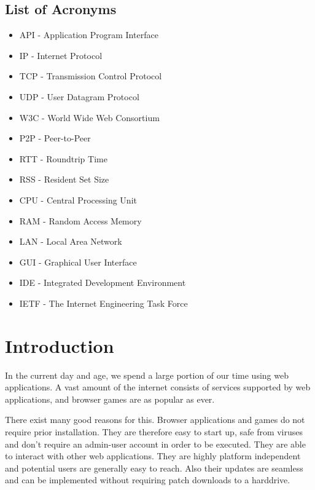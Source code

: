 \documentclass[bsc,frontabs,twoside,singlespacing,parskip,deptreport]{infthesis}     %
\begin{document}
\section*{List of Acronyms}
\begin{itemize}
\item API - Application Program Interface
\item IP - Internet Protocol
\item TCP - Transmission Control Protocol
\item UDP - User Datagram Protocol
\item W3C - World Wide Web Consortium
\item P2P - Peer-to-Peer
\item RTT - Roundtrip Time
\item RSS - Resident Set Size
\item CPU - Central Processing Unit
\item RAM - Random Access Memory
\item LAN - Local Area Network
\item GUI - Graphical User Interface
\item IDE - Integrated Development Environment
\item IETF - The Internet Engineering Task Force
\end{itemize}

\tableofcontents




\chapter{Introduction}
In the current day and age, we spend a large portion of our time using web applications. A vast amount of the internet consists of services supported by web applications, and browser games are as popular as ever.

There exist many good reasons for this. Browser applications and games do not require prior installation. They are therefore easy to start up, safe from viruses and don't require an admin-user account in order to be executed\cite{Web_Apps_Superior}. They are able to interact with other web applications. They are highly platform independent and potential users are generally easy to reach. Also their updates are seamless and can be implemented without requiring patch downloads to a harddrive.
\end{document}
